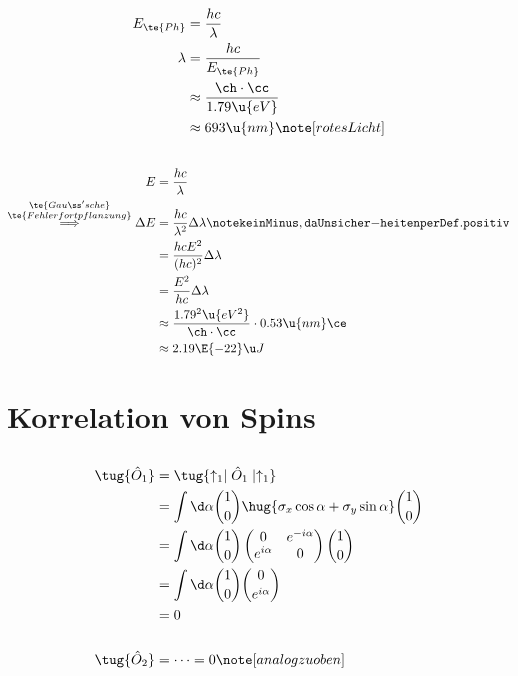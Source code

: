 \documentclass[ex,minted]{exercise_3.1}
\begin{document}
\subsection{}
\begin{align*}
    E_{\te{Ph}} &= \frac{hc}{\lambda}\\
    \lambda &= \frac{hc}{ E_{\te{Ph}}}\\
    &\approx \frac{\ch \cdot \cc}{1.79 \u{eV}}\\
    &\approx 693\u{nm} \note[rotes Licht ]
\end{align*}

\subsection{}
\begin{align*}
    E &= \frac{h c}{\lambda}\\
    \overset{\substack{\te{Gauß'sche}\\\te{Fehlerfortpflanzung}}}\implies\Delta E &= \frac{h c}{\lambda^2}\Delta \lambda
    \note\tt{kein Minus, da Unsicher-}{heiten per Def. positiv}\\
    &= \frac{h c E^2}{(hc)^2}\Delta \lambda\\
    &= \frac{E^2}{hc}\Delta \lambda\\
    &\approx \frac{1.79^2\u{eV^2}}{\ch\cdot \cc} \cdot 0.53\u{nm}\ce\\
    &\approx 2.19 \E{-22} \u J
\end{align*}

\section{Korrelation von Spins}
\subsection{}
\begin{align*}
    \tug{\hat O_1} &= \tug{\uparrow_1 \mid \hat O_1 \mid \uparrow_1}\\
    &= \int\d\alpha \binom10 \hug{\sigma_x\cos\alpha + \sigma_y\sin\alpha}\binom 10\\
    &= \int\d\alpha \binom10 \begin{pmatrix}
        0 & e^{-i\alpha}\\
        e^{i\alpha} &0 \\
    \end{pmatrix}\binom 10\\
    &= \int \d\alpha\binom10 \binom0{e^{i\alpha}}\\
    &= 0\\
    \\
    \tug{\hat O_2} &= \dots =0 \note[analog zu oben] 
\end{align*}
\end{document}
